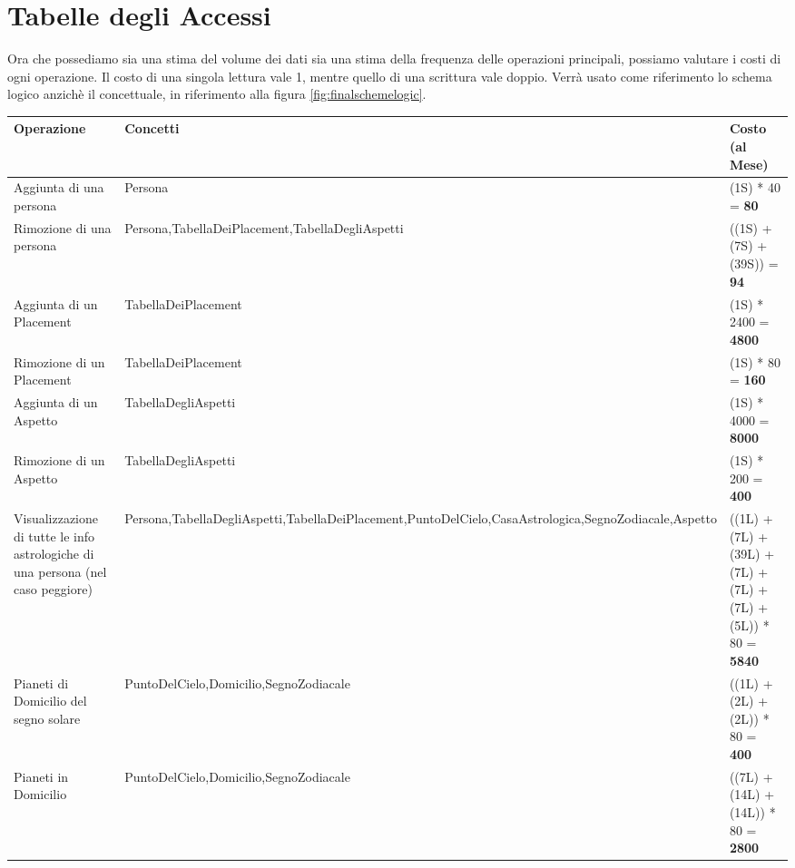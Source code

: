 \section{Tabelle degli Accessi}
Ora che possediamo sia una stima del volume dei dati sia una stima della frequenza delle operazioni principali, possiamo valutare i costi di ogni operazione. Il costo di una singola lettura vale 1, mentre quello di una scrittura vale doppio. Verrà usato come riferimento lo schema logico anzichè il concettuale, in riferimento alla figura \ref{fig:finalschemelogic}.
{
\begin{longtable}{ |p{3cm}|p{4cm}|p{4.5cm}|}
\endfoot
\hline
\textbf{Operazione} & \textbf{Concetti} & \textbf{Costo (al Mese)} \\
\hline
Aggiunta di una persona & Persona & (1S) * 40 = \textbf{80}\\
Rimozione di una persona & Persona,\newline TabellaDeiPlacement,\newline TabellaDegliAspetti  & ((1S) + (7S) + (39S)) = \textbf{94} \\
Aggiunta di un Placement & TabellaDeiPlacement & (1S) * 2400 = \textbf{4800}\\
Rimozione di un Placement & TabellaDeiPlacement & (1S) * 80 = \textbf{160}\\
Aggiunta di un Aspetto & TabellaDegliAspetti & (1S) * 4000 = \textbf{8000}\\
Rimozione di un Aspetto & TabellaDegliAspetti & (1S) * 200 = \textbf{400}\\
Visualizzazione di tutte le info astrologiche di una persona (nel caso peggiore) & Persona,\newline TabellaDegliAspetti,\newline TabellaDeiPlacement,\newline PuntoDelCielo,\newline CasaAstrologica,\newline SegnoZodiacale,\newline Aspetto &
((1L) + (7L) + (39L) + (7L) + (7L) + (7L) + (5L)) * 80 = \textbf{5840}\\
Pianeti di Domicilio del segno solare & PuntoDelCielo,\newline Domicilio,\newline SegnoZodiacale & ((1L) + (2L) + (2L)) * 80 = \textbf{400}\\
Pianeti in Domicilio & PuntoDelCielo,\newline Domicilio,\newline SegnoZodiacale & ((7L) + (14L) + (14L)) * 80 = \textbf{2800}\\

\end{longtable}}
